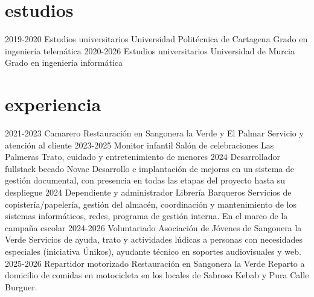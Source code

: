 \documentclass[]{twentysecondcv}
\begin{document}
\section{estudios}
\begin{twenty}
  \twentyitem
    {2019-2020}
    {Estudios universitarios}
    {Universidad Politécnica de Cartagena}
    {Grado en ingeniería telemática}
  \twentyitem
    {2020-2026}
    {Estudios universitarios}
    {Universidad de Murcia}
    {Grado en ingeniería informática}
\end{twenty}

\section{experiencia}
\begin{twenty}
  \twentyitem
    {2021-2023}
    {Camarero}
    {Restauración en Sangonera la Verde y El Palmar}
    {Servicio y atención al cliente}
  \twentyitem
    {2023-2025}
    {Monitor infantil}
    {Salón de celebraciones Las Palmeras}
    {Trato, cuidado y entretenimiento de menores}
\twentyitem
    {2024}
    {Desarrollador fullstack becado}
    {Novac}
    {Desarrollo e implantación de mejoras en un sistema de gestión documental, con presencia en todas las etapas del proyecto hasta su despliegue}
\twentyitem
    {2024}
    {Dependiente y administrador}
    {Librería Barqueros}
    {Servicios de copistería/papelería, gestión del almacén, coordinación y mantenimiento de los sistemas informáticos, redes, programa de gestión interna. En el marco de la campaña escolar}
\twentyitem
    {2024-2026}
    {Voluntariado}
    {Asociación de Jóvenes de Sangonera la Verde}
    {Servicios de ayuda, trato y actividades lúdicas a personas con necesidades especiales (iniciativa Únikos), ayudante técnico en soportes audiovisuales y web.}
\twentyitem
    {2025-2026}
    {Repartidor motorizado}
    {Restauración en Sangonera la Verde}
    {Reparto a domicilio de comidas en motocicleta en los locales de Sabroso Kebab y Pura Calle Burguer.}
\end{twenty}
\end{document}
